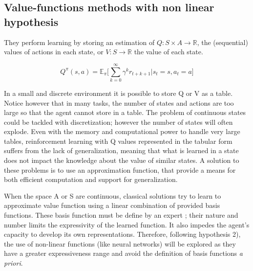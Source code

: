 \subsection{Value-functions methods with non linear hypothesis}

They perform learning by storing an estimation of $Q : S \times A \rightarrow \mathbb{R}$, the (sequential) values of actions in each state,
or $V : S \rightarrow \mathbb{R}$ the value of each state.

\begin{equation}
  Q^\pi(s, a) = \mathbb{E}_\pi \Big[ \sum_{k=0}^{\infty} \gamma^k r_{t+k+1} \Big| s_t = s, a_t = a \Big]
\end{equation}

In a small and discrete environment it is possible to store Q or V as a table.
Notice however that in many tasks, the number of states and actions are
too large so that the agent cannot store in a table. The problem of
continuous states could be tackled with discretization; however the number of
states will often explode. Even with the memory and computational power to
handle very large tables, reinforcement learning with Q values represented in the
tabular form suffers from the lack of generalization, meaning that what is learned
in a state does not impact the knowledge about the value of similar states.
A solution to these problems is to use an approximation function, that provide
a means for both efficient computation and support for generalization.



When the space A or S are continuous, classical solutions try to learn to approximate value function 
using a linear combination of provided basis functions. 
These basis function must be define by an expert ; their nature and number limits the expressivity 
of the learned function. It also impedes the agent's capacity to develop its own representations.
Therefore, following hypothesis 2), the use of non-linear functions (like neural networks) 
will be explored as they have a greater expressiveness range and avoid the definition of basis functions
{\it a priori}. 


% 

